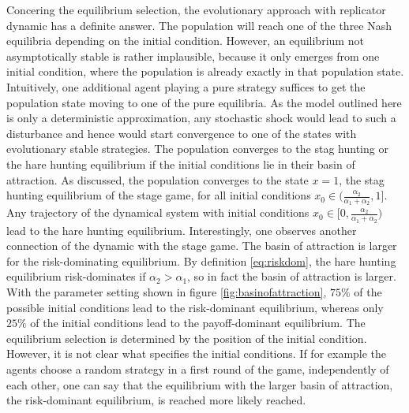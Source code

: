 Concering the equilibrium selection, the evolutionary approach with replicator
dynamic has a definite answer. The population will reach one of the three
Nash equilibria depending on the initial condition. 
However, an equilibrium not asymptotically stable is rather implausible,
because it only emerges from one initial condition, where the population
is already exactly in that population state. 
Intuitively, one additional agent playing
a pure strategy suffices to get the population state moving to one of the
pure equilibria. As the model outlined here is only a deterministic
approximation, any stochastic shock would lead to such a disturbance and hence
would start convergence to one of the states with evolutionary stable 
strategies.
The population converges to the stag hunting or the hare
hunting equilibrium if the initial conditions lie in their basin of attraction.
As discussed, the population converges to the state $x=1$, the stag hunting 
equilibrium of the stage game, for all initial conditions 
$x_0 \in (\frac{\alpha_2}{\alpha_1+\alpha_2},1]$. Any trajectory of the 
dynamical system with initial conditions 
$x_0 \in [0,\frac{\alpha_2}{\alpha_1+\alpha_2})$ lead to the hare hunting
equilibrium. Interestingly, one observes another connection of the 
dynamic with the stage game. The basin of attraction is larger for the
risk-dominating equilibrium. By definition \eqref{eq:riskdom}, 
the hare hunting equilibrium risk-dominates if $\alpha_2 > \alpha_1$,
so in fact the basin of attraction is larger. With the parameter setting shown
in figure \ref{fig:basinofattraction}, $75\%$ of the possible initial 
conditions lead to the risk-dominant equilibrium, whereas only $25\%$ of the 
initial conditions lead to the payoff-dominant equilibrium. 
The equilibrium selection is determined by the position of the initial
condition. However, it is not clear what specifies the initial conditions. 
If for example the agents choose a random strategy in a first round of the 
game, independently of each other, one can say that the equilibrium with the
larger basin of attraction, the risk-dominant equilibrium, is reached more 
likely reached. 
